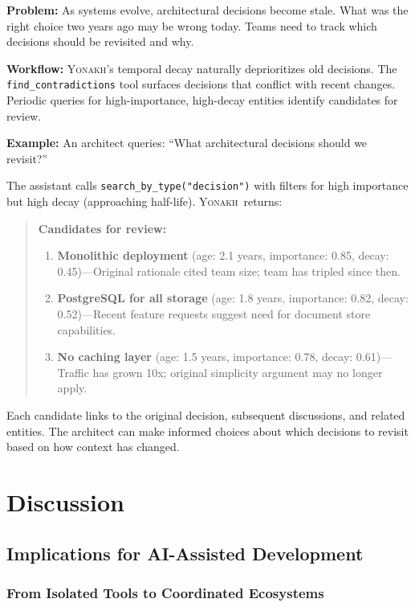 \documentclass[10pt,journal,compsoc]{IEEEtran}
\newcommand{\yonakh}{\textsc{Yonakh}}
\begin{document}
\textbf{Problem:} As systems evolve, architectural decisions become stale. What was the right choice two years ago may be wrong today. Teams need to track which decisions should be revisited and why.

\textbf{Workflow:} \yonakh's temporal decay naturally deprioritizes old decisions. The \texttt{find\_contradictions} tool surfaces decisions that conflict with recent changes. Periodic queries for high-importance, high-decay entities identify candidates for review.

\textbf{Example:} An architect queries: ``What architectural decisions should we revisit?''

The assistant calls \texttt{search\_by\_type("decision")} with filters for high importance but high decay (approaching half-life). \yonakh\ returns:

\begin{quote}
\textbf{Candidates for review:}
\begin{enumerate}
\item \textbf{Monolithic deployment} (age: 2.1 years, importance: 0.85, decay: 0.45)---Original rationale cited team size; team has tripled since then.

\item \textbf{PostgreSQL for all storage} (age: 1.8 years, importance: 0.82, decay: 0.52)---Recent feature requests suggest need for document store capabilities.

\item \textbf{No caching layer} (age: 1.5 years, importance: 0.78, decay: 0.61)---Traffic has grown 10x; original simplicity argument may no longer apply.
\end{enumerate}
\end{quote}

Each candidate links to the original decision, subsequent discussions, and related entities. The architect can make informed choices about which decisions to revisit based on how context has changed.

\section{Discussion}

\subsection{Implications for AI-Assisted Development}

\subsubsection{From Isolated Tools to Coordinated Ecosystems}
\end{document}

